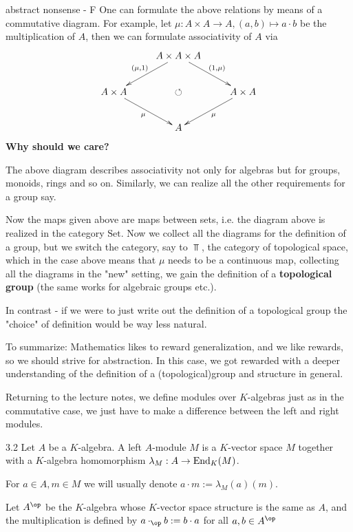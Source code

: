 \documentclass[twoside = false,	%
		headsepline,		%
		parskip = true,
		]{scrbook}						%
\begin{document}
        \begin{remark*}{abstract nonsense - F}
            One can formulate the above relations by means of a commutative diagram. For example, let $\mu: A \times A \to A, (a,b) \mapsto a \cdot b$ be the multiplication of $A$, then we can formulate associativity of $A$ via
            \begin{equation*}
                \xymatrix {
                & A \times A \times A \ar[dl]_{(\mu,1)} \ar[dr]^{(1,\mu)}& \\
                A \times A \ar[dr]_{\mu} & \circlearrowleft & A \times A\ar[dl]^{\mu} \\
                & A & 
                }
            \end{equation*}
            \textbf{Why should we care?}
            
            The above diagram describes associativity not only for algebras but for groups, monoids, rings and so on. Similarly, we can realize all the other requirements for a group say.
            
            Now the maps given above are maps between sets, i.e. the diagram above is realized in the category $\mathrm{Set}$. Now we collect all the diagrams for the definition of a group, but we switch the category, say to $\Top$, the category of topological space, which in the case above means that $\mu$ needs to be a continuous map, collecting all the diagrams in the "new" setting, we gain the definition of a \textbf{topological group} (the same works for algebraic groups etc.).
            
            In contrast - if we were to just write out the definition of a topological group the "choice" of definition would be way less natural.

            To summarize: Mathematics likes to reward generalization, and we like rewards, so we should strive for abstraction. In this case, we got rewarded with a deeper understanding of the definition of a (topological)group and structure in general.
        \end{remark*}

        Returning to the lecture notes, we define modules over $K$-algebras just as in the commutative case, we just have to make a difference between the left and right modules.

        \begin{definition}{}{3.2}
            Let $A$ be a $K$-algebra. A left $A$-module $M$ is a $K$-vector space $M$ together with a $K$-algebra homomorphism $\lambda_M: A \to \mathrm{End}_K(M)$.

            For $a \in A, m \in M$ we will usually denote $a \cdot m := \lambda_M(a)(m)$.

            Let $A^{\op}$ be the $K$-algebra whose $K$-vector space structure is the same as $A$, and the multiplication is defined by $a \cdot_{\op} b:= b \cdot a$ for all $a,b \in A^{\op}$
        \end{definition}
\end{document}
